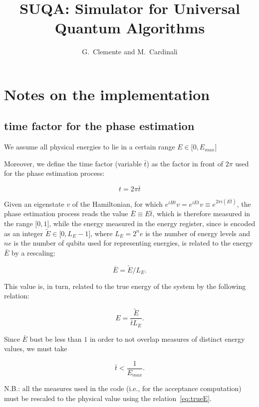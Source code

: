 \documentclass{article}
\title{SUQA: Simulator for Universal Quantum Algorithms}
\author{G.~Clemente and M.~Cardinali}
\begin{document}
\maketitle

\section{Notes on the implementation}


\subsection{time factor for the phase estimation}

We assume all physical energies to lie in a certain range $E\in \lbrack 0, E_{max}\rbrack$

Moreover, we define the time factor (variable $\bar{t}$) as the factor in front
of $2 \pi$ used for the phase estimation process:

$$t = 2 \pi \bar{t}$$

Given an eigenstate $v$ of the Hamiltonian, for which $e^{i H t}v = e^{i E t}v \equiv e^{2\pi i (E \bar{t})}$,
the phase estimation process reads the value $\bar{E} \equiv E \bar{t}$, which is therefore measured in the range $\lbrack 0, 1\rbrack$,
while the energy measured in the energy register, since is encoded as an integer
$\widetilde{E} \in \lbrack 0, L_{E}-1\rbrack$,
where $L_{E}=2^ne$ is the number of energy levels and $ne$ is the number of qubits used for representing energies, is related to 
the energy $\bar{E}$ by a rescaling:

$$\bar{E} = \widetilde{E}/L_{E}.$$

This value is, in turn, related to the true energy of the system by the following relation:

\begin{equation}\label{eq:trueE}
    E =  \frac{\widetilde{E}}{\bar{t} L_{E}}.
\end{equation}

Since $\bar{E}$ bust be less than $1$ in order to not overlap measures of distinct energy values, we must take

$$\bar{t} < \frac{1}{E_{max}}.$$


N.B.: all the measures used in the code (i.e., for the acceptance computation) must be rescaled to the physical value
using the relation~\ref{eq:trueE}.
\end{document}
